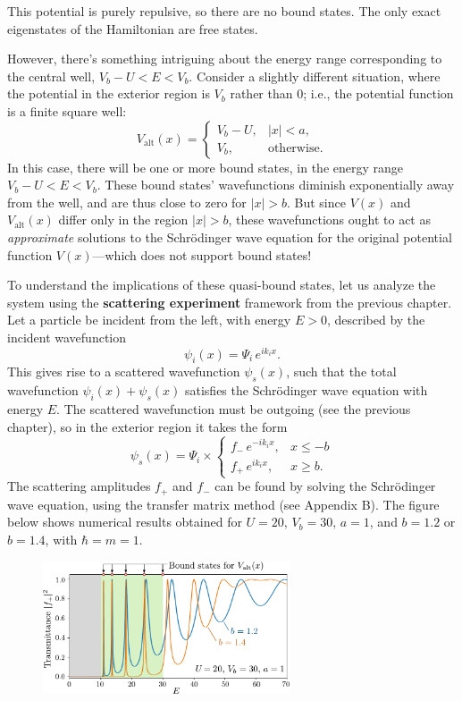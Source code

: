 \documentclass[pra,12pt]{revtex4}
\begin{document}
This potential is purely repulsive, so there are no bound states.  The
only exact eigenstates of the Hamiltonian are free states.

However, there's something intriguing about the energy range
corresponding to the central well, $V_b-U < E < V_b$.  Consider a
slightly different situation, where the potential in the exterior
region is $V_b$ rather than $0$; i.e., the potential function is a
finite square well:
$$V_{\mathrm{alt}}(x) = \begin{cases}V_b - U, & |x| < a, \\ V_b, & \mathrm{otherwise}.\end{cases}$$
In this case, there will be one or more bound states, in the energy
range $V_b-U < E < V_b$.  These bound states' wavefunctions diminish
exponentially away from the well, and are thus close to zero for $|x|
> b$.  But since $V(x)$ and $V_{\mathrm{alt}}(x)$ differ only in the
region $|x| > b$, these wavefunctions ought to act as
\textit{approximate} solutions to the Schr\"odinger wave equation for
the original potential function $V(x)$---which does not support bound
states!

To understand the implications of these quasi-bound states, let us
analyze the system using the \textbf{scattering experiment} framework
from the previous chapter.  Let a particle be incident from the left,
with energy $E > 0$, described by the incident wavefunction
$$\psi_i(x) = \Psi_i \, e^{ik_i x}.$$
This gives rise to a scattered wavefunction $\psi_s(x)$, such that the
total wavefunction $\psi_i(x) + \psi_s(x)$ satisfies the Schr\"odinger
wave equation with energy $E$.  The scattered wavefunction must be
outgoing (see the previous chapter), so in the exterior region it
takes the form
$$\psi_s(x) = \Psi_i \times \begin{cases}f_- \,e^{-ik_ix}, & x \le -b \\ f_+ \,e^{ik_ix}, & x \ge b.\end{cases}$$
The scattering amplitudes $f_+$ and $f_-$ can be found by solving the
Schr\"odinger wave equation, using the transfer matrix method (see
Appendix B).  The figure below shows numerical results obtained for
$U = 20,\,V_b = 30,\,a=1$, and $b = 1.2$ or $b = 1.4$, with $\hbar =
m = 1$.

\begin{figure}[h]
  \centering\includegraphics[width=0.65\textwidth]{resonances}
\end{figure}
\end{document}
